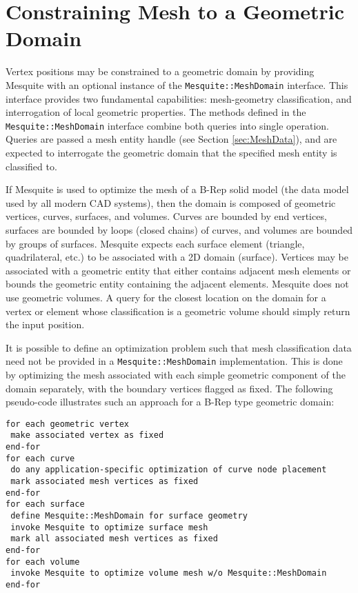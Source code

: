 \chapter{Constraining Mesh to a Geometric Domain}
\label{sec:geom}

Vertex positions may be constrained to a geometric domain by providing Mesquite
with an optional instance of the \texttt{Mesquite::MeshDomain} interface.  This
interface provides two fundamental capabilities: mesh-geometry classification,
and interrogation of local geometric properties.  The methods defined in the 
\texttt{Mesquite::MeshDomain} interface combine both queries into single
operation.  Queries are passed a mesh entity handle (see Section \ref{sec:MeshData}),
and are expected to interrogate the geometric domain that the specified mesh
entity is classified to.

If Mesquite is used to optimize the mesh of a B-Rep solid model (the data model used by all modern CAD systems), then the domain is composed of geometric vertices,
curves, surfaces, and volumes.  Curves are bounded by end vertices, surfaces are
bounded by loops (closed chains) of curves, and volumes are bounded by groups of
surfaces.  Mesquite expects each surface element (triangle, quadrilateral, etc.)
to be associated with a 2D domain (surface).  Vertices may be associated with
a geometric entity that either contains adjacent mesh elements or bounds the
geometric entity containing the adjacent elements. Mesquite does not use 
geometric volumes.  A query for the closest location on the domain for a vertex 
or element whose classification is a geometric volume should simply return the 
input position.  

It is possible to define an optimization problem such that mesh classification
data need not be provided in a \texttt{Mesquite::MeshDomain} implementation. 
This is done by optimizing the mesh associated with each simple geometric
component of the domain separately, with the boundary vertices flagged as fixed.
The following pseudo-code illustrates such an approach for a B-Rep type geometric
domain:
\begin{verbatim}
for each geometric vertex
 make associated vertex as fixed
end-for
for each curve
 do any application-specific optimization of curve node placement
 mark associated mesh vertices as fixed
end-for
for each surface
 define Mesquite::MeshDomain for surface geometry
 invoke Mesquite to optimize surface mesh
 mark all associated mesh vertices as fixed
end-for
for each volume
 invoke Mesquite to optimize volume mesh w/o Mesquite::MeshDomain
end-for
\end{verbatim}


